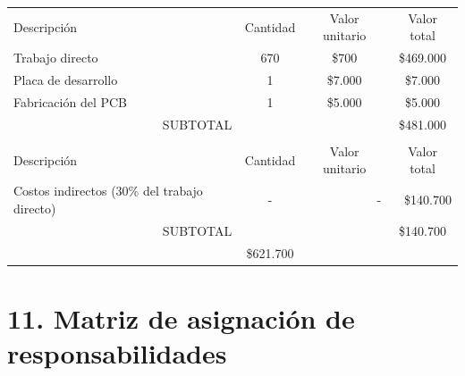 \documentclass[
11pt, %
codirector, %
]{charter}
\begin{document}
\begin{table}[htpb]
\centering
\begin{tabularx}{\linewidth}{@{}|X|c|r|r|@{}}
\hline
\rowcolor[HTML]{C0C0C0} 
\multicolumn{4}{|c|}{\cellcolor[HTML]{C0C0C0}COSTOS DIRECTOS} \\ \hline
\rowcolor[HTML]{C0C0C0} 
Descripción &
  \multicolumn{1}{c|}{\cellcolor[HTML]{C0C0C0}Cantidad} &
  \multicolumn{1}{c|}{\cellcolor[HTML]{C0C0C0}Valor unitario} &
  \multicolumn{1}{c|}{\cellcolor[HTML]{C0C0C0}Valor total} \\ \hline
 Trabajo directo &
  \multicolumn{1}{c|}{670} &
  \multicolumn{1}{c|}{\$700} &
  \multicolumn{1}{c|}{\$469.000} \\ \hline
 Placa de desarrollo &
  \multicolumn{1}{c|}{1} &
  \multicolumn{1}{c|}{\$7.000} &
  \multicolumn{1}{c|}{\$7.000} \\ \hline
 Fabricación del PCB &
  \multicolumn{1}{c|}{1} &
  \multicolumn{1}{c|}{\$5.000} &
  \multicolumn{1}{c|}{\$5.000} \\ \hline
\multicolumn{3}{|c|}{SUBTOTAL} &
  \multicolumn{1}{c|}{\$481.000} \\ \hline
\rowcolor[HTML]{C0C0C0} 
\multicolumn{4}{|c|}{\cellcolor[HTML]{C0C0C0}COSTOS INDIRECTOS} \\ \hline
\rowcolor[HTML]{C0C0C0} 
Descripción &
  \multicolumn{1}{c|}{\cellcolor[HTML]{C0C0C0}Cantidad} &
  \multicolumn{1}{c|}{\cellcolor[HTML]{C0C0C0}Valor unitario} &
  \multicolumn{1}{c|}{\cellcolor[HTML]{C0C0C0}Valor total} \\ \hline
\multicolumn{1}{|l|}{Costos indirectos (30\% del trabajo directo)} &
   - &
   - &
   \$140.700\\ \hline

\multicolumn{3}{|c|}{SUBTOTAL} &
  \multicolumn{1}{c|}{\$140.700} \\ \hline
\rowcolor[HTML]{C0C0C0}
\multicolumn{3}{|c|}{TOTAL} &
   \$621.700\\ \hline
\end{tabularx}%
\end{table}


\section{11. Matriz de asignación de responsabilidades}
\label{sec:responsabilidades}
\end{document}
